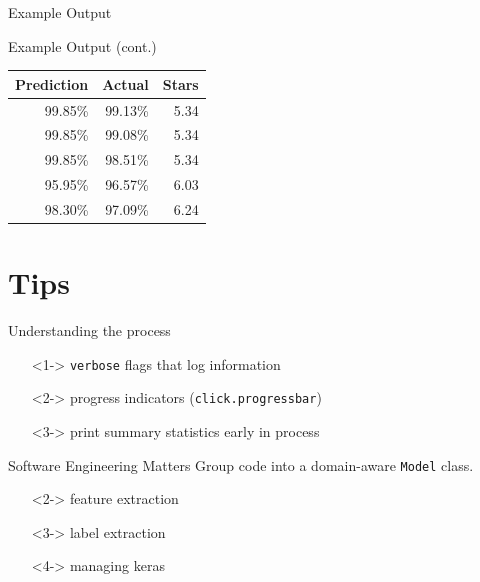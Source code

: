 \documentclass[table]{beamer}
\begin{document}
\begin{frame}{Example Output}
\end{frame}

\begin{frame}{Example Output (cont.)}
  \begin{center}
    \begin{tabular}{r | r | r}
      Prediction & Actual & Stars \\
      \hline
      99.85\% & 99.13\% & 5.34 \\
      99.85\% & 99.08\% & 5.34 \\
      99.85\% & 98.51\% & 5.34 \\
      95.95\% & 96.57\% & 6.03 \\
      98.30\% & 97.09\% & 6.24
    \end{tabular}
  \end{center}
\end{frame}

\section{Tips}

\begin{frame}{Understanding the process}
  \begin{itemize}
  \item[]<1-> \texttt{verbose} flags that log information
  \item[]<2-> progress indicators (\texttt{click.progressbar})
  \item[]<3-> print summary statistics early in process
  \end{itemize}
\end{frame}

\begin{frame}{Software Engineering Matters}
  Group code into a domain-aware \texttt{Model} class.

  \begin{itemize}
  \item[]<2-> feature extraction
  \item[]<3-> label extraction
  \item[]<4-> managing keras
  \end{itemize}
\end{frame}
\end{document}
